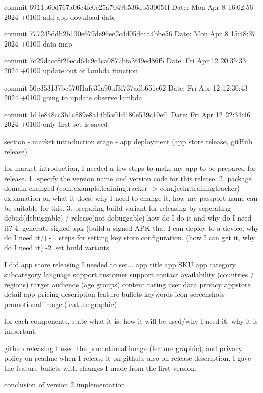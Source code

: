 commit 6911b60d767a06c4fe0e25a7049b536db530051f
Date:   Mon Apr 8 16:02:56 2024 +0100
    add app download date

commit 777245ddb2b130e679de96ee2c4d05dcca4bbe56
Date:   Mon Apr 8 15:48:37 2024 +0100
    data map

commit 7c29dacc8f26ecd64c9c3ca0877bfa3f49ed86f5
Date:   Fri Apr 12 20:35:33 2024 +0100
    update out of lambda function

commit 50c353137bc570f1afc35a90af3f737adb651c62
Date:   Fri Apr 12 12:30:43 2024 +0100
    going to update observe lambda


commit 1d1e848cc3b1c889e8a14b5a01d180e539c10ef1
Date:   Fri Apr 12 22:34:46 2024 +0100
    only first set is saved


section - market introduction stage - app deployment (app store release, gitHub release)

for market introduction, I needed a few steps to make my app to be prepared for release.
1. specify the version name and version code for this release. 
2. package domain changed (com.example.trainingtracker -> com.jeein.trainingtracker)
{explanation on what it does, why I need to change it, how my passport name can be suitable for this.}
3. preparing build variant for releasing
by seperating debud(debuggable) / release(not debuggable)
how do I do it and why do I need it?
4. generate signed apk
(build a signed APK that I can deploy to a device, why do I need it/)
-1. steps for setting key store configuration. (how I can get it, why do I need it)
-2. set build variants 


I did app store releasing
I needed to set... 
app title
app SKU
app category
subcategory
language support
customer support contact 
availability (countries / regions)
target audience (age groups)
content rating 
user data privacy
appstore detail
app pricing
description
feature bullets 
keywords
icon
screenshots
promotional image (feature graphic)

for each components, state what it is, how it will be used/why I need it, why it is important. 

github releasing 
I used the promotional image (feature graphic), and privacy policy on readme when I release it on github.
also on release description, I gave the feature bullets with changes I made from the first version. 


conclusion of version 2 implementation


